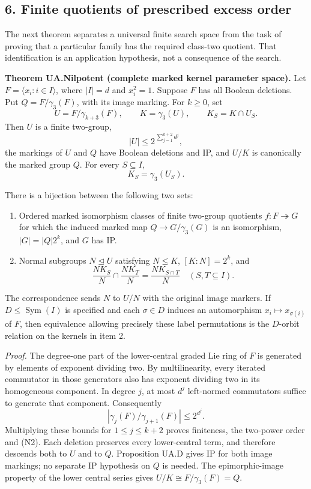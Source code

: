 \documentclass[
  11pt,
  a4paper,
]{article}
\providecommand{\tightlist}{%
  \setlength{\itemsep}{0pt}\setlength{\parskip}{0pt}}
\begin{document}
\subsection{6. Finite quotients of prescribed excess
order}\label{finite-quotients-of-prescribed-excess-order}

The next theorem separates a universal finite search space from the task
of proving that a particular family has the required class-two quotient.
That identification is an application hypothesis, not a consequence of
the search.

\textbf{Theorem UA.Nilpotent (complete marked kernel parameter space).}
Let \(F=\langle x_i:i\in I\rangle\), where \(|I|=d\) and \(x_i^2=1\).
Suppose \(F\) has all Boolean deletions. Put \(Q=F/\gamma_3(F)\), with
its image marking. For \(k\geq0\), set \[
U=F/\gamma_{k+3}(F),\qquad K=\gamma_3(U),\qquad
K_S=K\cap U_S.
\tag{N1}
\] Then \(U\) is a finite two-group, \[
|U|\leq 2^{\,\sum_{j=1}^{k+2}d^j},
\tag{N2}
\] the markings of \(U\) and \(Q\) have Boolean deletions and IP, and
\(U/K\) is canonically the marked group \(Q\). For every
\(S\subseteq I\), \[
K_S=\gamma_3(U_S).
\tag{N3}
\]

There is a bijection between the following two sets:

\begin{enumerate}
\def\labelenumi{\arabic{enumi}.}
\tightlist
\item
  Ordered marked isomorphism classes of finite two-group quotients
  \(f:F\twoheadrightarrow G\) for which the induced marked map
  \(Q\to G/\gamma_3(G)\) is an isomorphism, \(|G|=|Q|2^k\), and \(G\)
  has IP.
\item
  Normal subgroups \(N\unlhd U\) satisfying \(N\leq K\), \([K:N]=2^k\),
  and \[
  \frac{NK_S}{N}\cap\frac{NK_T}{N}
  =\frac{NK_{S\cap T}}{N}
  \quad(S,T\subseteq I).
  \tag{N4}
  \]
\end{enumerate}

The correspondence sends \(N\) to \(U/N\) with the original image
markers. If \(D\leq\operatorname{Sym}(I)\) is specified and each
\(\sigma\in D\) induces an automorphism \(x_i\mapsto x_{\sigma(i)}\) of
\(F\), then equivalence allowing precisely these label permutations is
the \(D\)-orbit relation on the kernels in item 2.

\emph{Proof.} The degree-one part of the lower-central graded Lie ring
of \(F\) is generated by elements of exponent dividing two. By
multilinearity, every iterated commutator in those generators also has
exponent dividing two in its homogeneous component. In degree \(j\), at
most \(d^j\) left-normed commutators suffice to generate that component.
Consequently \[
|\gamma_j(F)/\gamma_{j+1}(F)|\leq2^{d^j}.
\] Multiplying these bounds for \(1\leq j\leq k+2\) proves finiteness,
the two-power order and (N2). Each deletion preserves every
lower-central term, and therefore descends both to \(U\) and to \(Q\).
Proposition UA.D gives IP for both image markings; no separate IP
hypothesis on \(Q\) is needed. The epimorphic-image property of the
lower central series gives \(U/K\cong F/\gamma_3(F)=Q\).
\end{document}
